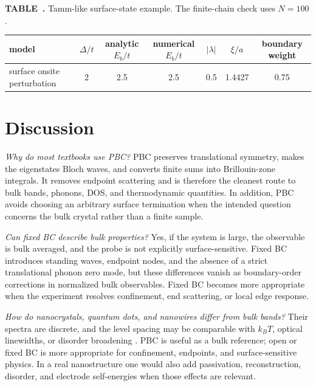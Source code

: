 ﻿\documentclass[a4paper,aps,prb,reprint,floatfix,nofootinbib,longbibliography]{revtex4-2}
\begin{document}
\begin{widetext}
\begingroup
{}\label{tab:surface}
\begin{center}
\small
\setlength{\tabcolsep}{8pt}
\textbf{TABLE~.} Tamm-like surface-state example.  The finite-chain check uses \(N=100\).
\vspace{0.5em}

\begin{ruledtabular}
\begin{tabular}{lcccccc}
model & \(\Delta/t\) & analytic \(E_b/t\) & numerical \(E_b/t\) & \(|\lambda|\) & \(\xi/a\) & boundary weight\\
\hline
surface onsite perturbation & 2 & 2.5 & 2.5 & 0.5 & 1.4427 & 0.75
\end{tabular}
\end{ruledtabular}
\end{center}
\endgroup
\end{widetext}

\section{Discussion}

\textit{Why do most textbooks use PBC?}  PBC preserves translational symmetry, makes the eigenstates Bloch waves, and converts finite sums into Brillouin-zone integrals.  It removes endpoint scattering and is therefore the cleanest route to bulk bands, phonons, DOS, and thermodynamic quantities.  In addition, PBC avoids choosing an arbitrary surface termination when the intended question concerns the bulk crystal rather than a finite sample.

\textit{Can fixed BC describe bulk properties?}  Yes, if the system is large, the observable is bulk averaged, and the probe is not explicitly surface-sensitive.  Fixed BC introduces standing waves, endpoint nodes, and the absence of a strict translational phonon zero mode, but these differences vanish as boundary-order corrections in normalized bulk observables.  Fixed BC becomes more appropriate when the experiment resolves confinement, end scattering, or local edge response.

\textit{How do nanocrystals, quantum dots, and nanowires differ from bulk bands?}  Their spectra are discrete, and the level spacing may be comparable with \(k_BT\), optical linewidths, or disorder broadening \cite{Datta}.  PBC is useful as a bulk reference; open or fixed BC is more appropriate for confinement, endpoints, and surface-sensitive physics.  In a real nanostructure one would also add passivation, reconstruction, disorder, and electrode self-energies when those effects are relevant.
\end{document}
